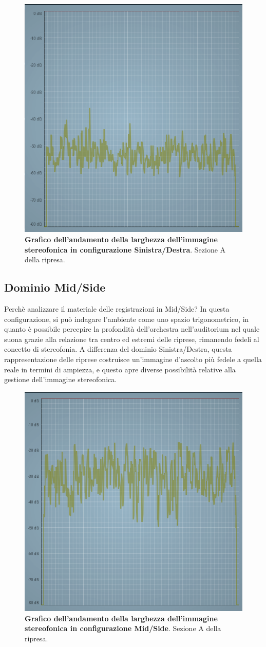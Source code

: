 \begin{figure}[h]
	\begin{center}
		\includegraphics[width=.47\textwidth]{img/image3.png}
		\caption{\textbf{Grafico dell'andamento della larghezza dell'immagine stereofonica in configurazione Sinistra/Destra}. Sezione A della ripresa.}
		\label{gr01}
	\end{center}
\end{figure}

\subsection*{Dominio Mid/Side}
Perchè analizzare il materiale delle registrazioni in Mid/Side?
In questa configurazione, si può indagare l'ambiente come uno spazio trigonometrico, in quanto è possibile percepire la profondità dell'orchestra nell'auditorium nel quale suona grazie alla relazione tra centro ed estremi delle riprese, rimanendo fedeli al concetto di stereofonia.
A differenza del dominio Sinistra/Destra, questa rappresentazione delle riprese costruisce un'immagine d'ascolto più fedele a quella reale in termini di ampiezza, e questo apre diverse possibilità relative alla gestione dell'immagine stereofonica.

\begin{figure}[h]
	\begin{center}
		\includegraphics[width=.47\textwidth]{img/image4.png}
		\caption{\textbf{Grafico dell'andamento della larghezza dell'immagine stereofonica in configurazione Mid/Side}. Sezione A della ripresa.}
		\label{gr01}
	\end{center}
\end{figure}

